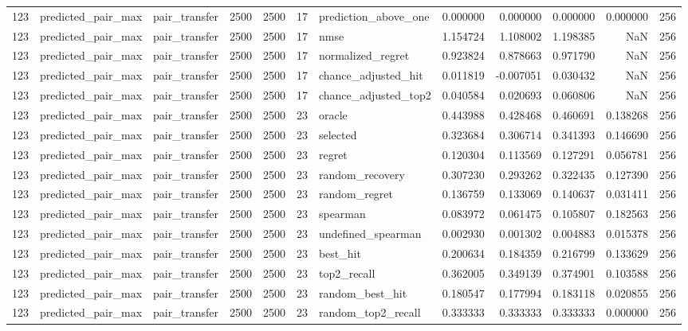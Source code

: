 \begin{tabular}{rllrrrlrrrrr}
123 & predicted_pair_max & pair_transfer & 2500 & 2500 & 17 & prediction_above_one & 0.000000 & 0.000000 & 0.000000 & 0.000000 & 256 \\
123 & predicted_pair_max & pair_transfer & 2500 & 2500 & 17 & nmse & 1.154724 & 1.108002 & 1.198385 & NaN & 256 \\
123 & predicted_pair_max & pair_transfer & 2500 & 2500 & 17 & normalized_regret & 0.923824 & 0.878663 & 0.971790 & NaN & 256 \\
123 & predicted_pair_max & pair_transfer & 2500 & 2500 & 17 & chance_adjusted_hit & 0.011819 & -0.007051 & 0.030432 & NaN & 256 \\
123 & predicted_pair_max & pair_transfer & 2500 & 2500 & 17 & chance_adjusted_top2 & 0.040584 & 0.020693 & 0.060806 & NaN & 256 \\
123 & predicted_pair_max & pair_transfer & 2500 & 2500 & 23 & oracle & 0.443988 & 0.428468 & 0.460691 & 0.138268 & 256 \\
123 & predicted_pair_max & pair_transfer & 2500 & 2500 & 23 & selected & 0.323684 & 0.306714 & 0.341393 & 0.146690 & 256 \\
123 & predicted_pair_max & pair_transfer & 2500 & 2500 & 23 & regret & 0.120304 & 0.113569 & 0.127291 & 0.056781 & 256 \\
123 & predicted_pair_max & pair_transfer & 2500 & 2500 & 23 & random_recovery & 0.307230 & 0.293262 & 0.322435 & 0.127390 & 256 \\
123 & predicted_pair_max & pair_transfer & 2500 & 2500 & 23 & random_regret & 0.136759 & 0.133069 & 0.140637 & 0.031411 & 256 \\
123 & predicted_pair_max & pair_transfer & 2500 & 2500 & 23 & spearman & 0.083972 & 0.061475 & 0.105807 & 0.182563 & 256 \\
123 & predicted_pair_max & pair_transfer & 2500 & 2500 & 23 & undefined_spearman & 0.002930 & 0.001302 & 0.004883 & 0.015378 & 256 \\
123 & predicted_pair_max & pair_transfer & 2500 & 2500 & 23 & best_hit & 0.200634 & 0.184359 & 0.216799 & 0.133629 & 256 \\
123 & predicted_pair_max & pair_transfer & 2500 & 2500 & 23 & top2_recall & 0.362005 & 0.349139 & 0.374901 & 0.103588 & 256 \\
123 & predicted_pair_max & pair_transfer & 2500 & 2500 & 23 & random_best_hit & 0.180547 & 0.177994 & 0.183118 & 0.020855 & 256 \\
123 & predicted_pair_max & pair_transfer & 2500 & 2500 & 23 & random_top2_recall & 0.333333 & 0.333333 & 0.333333 & 0.000000 & 256 \\

\end{tabular}

